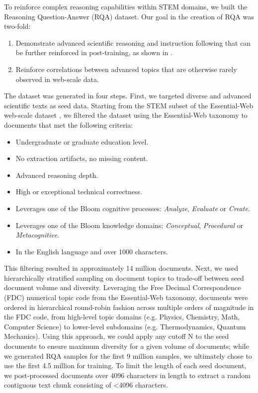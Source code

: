 To reinforce complex reasoning capabilities within STEM domains, we built the Reasoning Question-Answer (RQA) dataset. Our goal in the creation of RQA was two-fold: 
%
\begin{enumerate}
    \item[i)] Demonstrate advanced scientific reasoning and instruction following that can be further reinforced in post-training, as shown in \cite{akter2025frontload}.
    \item[ii)] Reinforce correlations between advanced topics that are otherwise rarely observed in web-scale data. 
\end{enumerate}
%
The dataset was generated in four steps. First, we targeted diverse and advanced scientific texts as seed data. Starting from the STEM subset of the Essential-Web web-scale dataset \citep{essentialweb}, we filtered the dataset using the Essential-Web taxonomy to documents that met the following criteria:
%
\begin{itemize}
    \item Undergraduate or graduate education level.
    \item No extraction artifacts, no missing content.
    \item Advanced reasoning depth.
    \item High or exceptional technical correctness.
    \item Leverages one of the Bloom cognitive processes: \emph{Analyze}, \emph{Evaluate} or \emph{Create}.
    \item Leverages one of the Bloom knowledge domains: \emph{Conceptual}, \emph{Procedural} or \emph{Metacognitive}.
    \item In the English language and over 1000 characters.
\end{itemize}

This filtering resulted in approximately 14 million documents. Next, we used hierarchically stratified sampling on document topics to trade-off between seed document volume and diversity. Leveraging the Free Decimal Correspondence (FDC) numerical topic code from the Essential-Web taxonomy, documents were ordered in hierarchical round-robin fashion across multiple orders of magnitude in the FDC code, from high-level topic domains (e.g. Physics, Chemistry, Math, Computer Science) to lower-level subdomains (e.g. Thermodynamics, Quantum Mechanics). Using this approach, we could apply any cutoff N to the seed documents to ensure maximum diversity for a given volume of documents; while we generated RQA samples for the first 9 million samples, we ultimately chose to use the first 4.5 million for training. To limit the length of each seed document, we post-processed documents over 4096 characters in length to extract a random contiguous text chunk consisting of <4096 characters.

